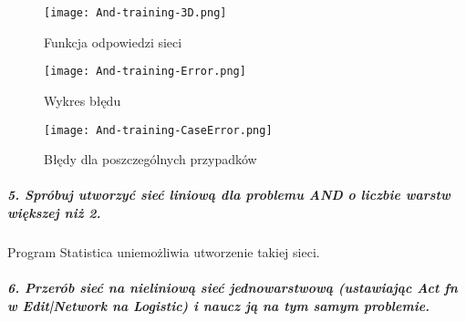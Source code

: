 \documentclass{article}
\begin{document}
\begin{figure}[H]
\begin{center}
\texttt{[image: And-training-3D.png]}
\end{center}
\caption{Funkcja odpowiedzi sieci}
\label{fig-1Tdelta}
\end{figure}

\begin{figure}[H]
\begin{center}
\texttt{[image: And-training-Error.png]}
\end{center}
\caption{Wykres błędu}
\label{fig-1Tdelta}
\end{figure}

\begin{figure}[H]
\begin{center}
\texttt{[image: And-training-CaseError.png]}
\end{center}
\caption{Błędy dla poszczególnych przypadków}
\label{fig-1Tdelta}
\end{figure}
 
\subparagraph{5. Spróbuj utworzyć sieć liniową dla problemu AND o liczbie warstw większej niż 2.\\}
Program Statistica uniemożliwia utworzenie takiej sieci.

\subparagraph{6. Przerób sieć na nieliniową sieć jednowarstwową (ustawiając Act fn w Edit|Network na Logistic) i naucz ją na tym samym problemie.}
\end{document}

